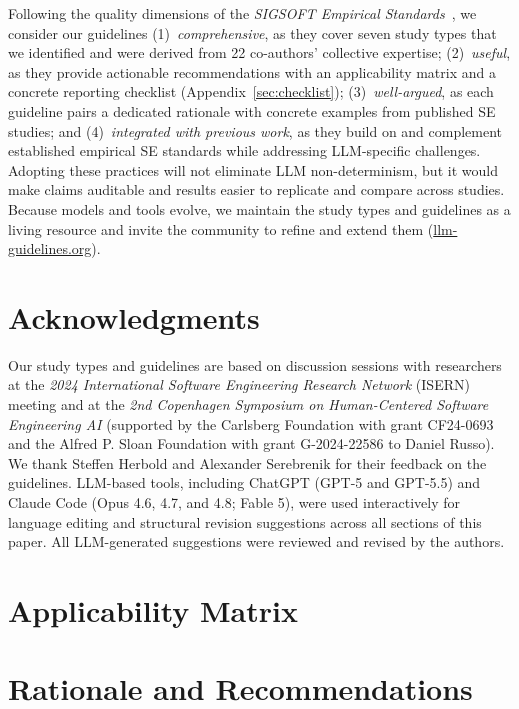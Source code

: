 Following the quality dimensions of the \emph{SIGSOFT Empirical
Standards}~\cite{ralph2021empiricalstandardssoftwareengineering}, we
consider our guidelines
(1)~\emph{comprehensive}, as they cover seven study types that we
identified and were derived from 22 co-authors' collective expertise;
(2)~\emph{useful}, as they provide actionable recommendations with an
applicability matrix and a concrete reporting checklist
(Appendix~\ref{sec:checklist});
(3)~\emph{well-argued}, as each guideline pairs a dedicated
rationale with concrete examples from published SE studies; and
(4)~\emph{integrated with previous work}, as they build on and
complement established empirical SE standards while addressing
LLM-specific challenges.
Adopting these practices will not eliminate LLM non-determinism, but it
would make claims auditable and results easier to replicate and compare
across studies.
Because models and tools evolve, we maintain the study types and
guidelines as a living resource and invite the community to refine and
extend them (\href{https://llm-guidelines.org/}{llm-guidelines.org}).

\section*{Acknowledgments}

Our study types and guidelines are based on discussion sessions with researchers at the \emph{2024 International Software Engineering Research Network} (ISERN) meeting and at the \emph{2nd Copenhagen Symposium on Human-Centered Software Engineering AI} (supported by the Carlsberg Foundation with grant CF24-0693 and the Alfred P. Sloan Foundation with grant G-2024-22586 to Daniel Russo).
We thank Steffen Herbold and Alexander Serebrenik for their feedback on the guidelines.
LLM-based tools, including ChatGPT (GPT-5 and GPT-5.5) and Claude Code (Opus 4.6, 4.7, and 4.8; Fable 5), were used interactively for language editing and structural revision suggestions across all sections of this paper. All LLM-generated suggestions were reviewed and revised by the authors.

\begin{appendices}

\section{Applicability Matrix}
\nopagebreak


\section{Rationale and Recommendations}
\nopagebreak




\end{appendices}
